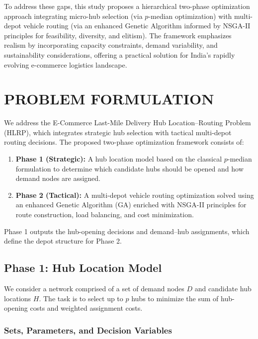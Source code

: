 \documentclass[conference]{IEEEtran}
\begin{document}
To address these gaps, this study proposes a hierarchical two-phase optimization approach integrating micro-hub selection (via $p$-median optimization) with multi-depot vehicle routing (via an enhanced Genetic Algorithm informed by NSGA-II principles for feasibility, diversity, and elitism). The framework emphasizes realism by incorporating capacity constraints, demand variability, and sustainability considerations, offering a practical solution for India's rapidly evolving e-commerce logistics landscape.

\section{PROBLEM FORMULATION}

We address the E-Commerce Last-Mile Delivery Hub Location–Routing Problem (HLRP), which integrates strategic hub selection with tactical multi-depot routing decisions. The proposed two-phase optimization framework consists of:

\begin{enumerate}
    \item \textbf{Phase 1 (Strategic):} A hub location model based on the classical $p$-median formulation to determine which candidate hubs should be opened and how demand nodes are assigned.
    \item \textbf{Phase 2 (Tactical):} A multi-depot vehicle routing optimization solved using an enhanced Genetic Algorithm (GA) enriched with NSGA-II principles for route construction, load balancing, and cost minimization.
\end{enumerate}

Phase 1 outputs the hub-opening decisions and demand–hub assignments, which define the depot structure for Phase 2.

\subsection{Phase 1: Hub Location Model}

We consider a network comprised of a set of demand nodes $D$ and candidate hub locations $H$. The task is to select up to $p$ hubs to minimize the sum of hub-opening costs and weighted assignment costs.

\subsubsection{Sets, Parameters, and Decision Variables}
\end{document}
